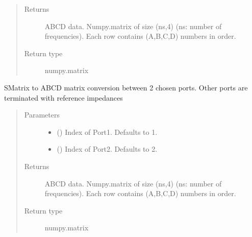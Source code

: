 \documentclass[letterpaper,10pt,english]{sphinxmanual}
\begin{document}
\begin{fulllineitems}
\begin{fulllineitems}
\begin{quote}
\begin{description}
\item[{Returns}] \leavevmode
ABCD data. Numpy.matrix of size (ns,4) (ns: number of frequencies). Each row contains (A,B,C,D) numbers in order.

\item[{Return type}] \leavevmode
numpy.matrix

\end{description}\end{quote}

\end{fulllineitems}


\begin{fulllineitems}
\label{\detokenize{touchstone:touchstone.spfile.s2abcd2}}
S\sphinxhyphen{}Matrix to ABCD matrix conversion between 2 chosen ports. Other ports are terminated with reference impedances
\begin{quote}\begin{description}
\item[{Parameters}] \leavevmode\begin{itemize}
\item {} 
 (\sphinxstyleliteralemphasis{\sphinxupquote{, }}) \textendash{} Index of Port\sphinxhyphen{}1. Defaults to 1.

\item {} 
 (\sphinxstyleliteralemphasis{\sphinxupquote{, }}) \textendash{} Index of Port\sphinxhyphen{}2. Defaults to 2.

\end{itemize}

\item[{Returns}] \leavevmode
ABCD data. Numpy.matrix of size (ns,4) (ns: number of frequencies). Each row contains (A,B,C,D) numbers in order.

\item[{Return type}] \leavevmode
numpy.matrix

\end{description}\end{quote}


\end{fulllineitems}
\end{fulllineitems}
\end{document}
